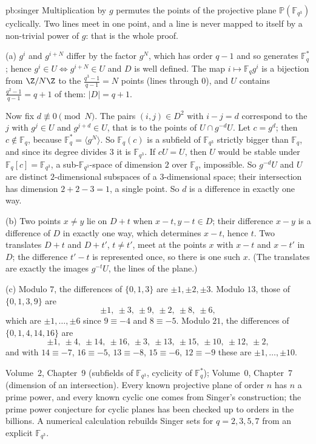 \begin{solution}{pb:singer}
\idea Multiplication by $g$ permutes the points of the projective plane $\mathbb P(\mathbb F_{q^3})$ cyclically. Two lines meet in
one point, and a line is never mapped to itself by a non-trivial power of $g$: that is the whole proof.

\writeup (a) $g^i$ and $g^{i+N}$ differ by the factor $g^N$, which has order $q-1$ and so generates $\mathbb F_q^*$; hence
$g^i\in U\iff g^{i+N}\in U$ and $D$ is well defined. The map $i\mapsto\mathbb F_qg^i$ is a bijection from $\Z/N\Z$ to the
$\frac{q^3-1}{q-1}=N$ points (lines through $0$), and $U$ contains $\frac{q^2-1}{q-1}=q+1$ of them: $|D|=q+1$.

Now fix $d\not\equiv0\pmod N$. The pairs $(i,j)\in D^2$ with $i-j=d$ correspond to the $j$ with $g^j\in U$ and $g^{j+d}\in U$, that is
to the points of $U\cap g^{-d}U$. Let $c=g^d$; then $c\notin\mathbb F_q$, because $\mathbb F_q^*=\langle g^N\rangle$. So
$\mathbb F_q(c)$ is a subfield of $\mathbb F_{q^3}$ strictly bigger than $\mathbb F_q$, and since its degree divides $3$ it is
$\mathbb F_{q^3}$. If $cU=U$, then $U$ would be stable under $\mathbb F_q[c]=\mathbb F_{q^3}$, a sub-$\mathbb F_{q^3}$-space of dimension
$2$ over $\mathbb F_q$, impossible. So $g^{-d}U$ and $U$ are distinct $2$-dimensional subspaces of a $3$-dimensional space; their
intersection has dimension $2+2-3=1$, a single point. So $d$ is a difference in exactly one way.

(b) Two points $x\ne y$ lie on $D+t$ when $x-t,y-t\in D$; their difference $x-y$ is a difference of $D$ in exactly one way, which
determines $x-t$, hence $t$. Two translates $D+t$ and $D+t'$, $t\ne t'$, meet at the points $x$ with $x-t$ and $x-t'$ in $D$; the
difference $t'-t$ is represented once, so there is one such $x$. (The translates are exactly the images $g^{-t}U$, the lines of the
plane.)

(c) Modulo $7$, the differences of $\{0,1,3\}$ are $\pm1,\pm2,\pm3$. Modulo $13$, those of $\{0,1,3,9\}$ are
\[
\pm1,\ \pm3,\ \pm9,\ \pm2,\ \pm8,\ \pm6,
\]
which are $\pm1,\dots,\pm6$ since $9\equiv-4$ and $8\equiv-5$. Modulo $21$, the differences of $\{0,1,4,14,16\}$ are
\[
\pm1,\ \pm4,\ \pm14,\ \pm16,\ \pm3,\ \pm13,\ \pm15,\ \pm10,\ \pm12,\ \pm2,
\]
and with $14\equiv-7$, $16\equiv-5$, $13\equiv-8$, $15\equiv-6$, $12\equiv-9$ these are $\pm1,\dots,\pm10$.

\tools Volume~2, Chapter~9 (subfields of $\mathbb F_{q^3}$, cyclicity of $\mathbb F_q^*$); Volume~0, Chapter~7 (dimension of an
intersection).
\leads Every known projective plane of order $n$ has $n$ a prime power, and every known cyclic one comes from Singer's construction;
the prime power conjecture for cyclic planes has been checked up to orders in the billions. A numerical calculation rebuilds Singer sets for
$q=2,3,5,7$ from an explicit $\mathbb F_{q^3}$.
\end{solution}

